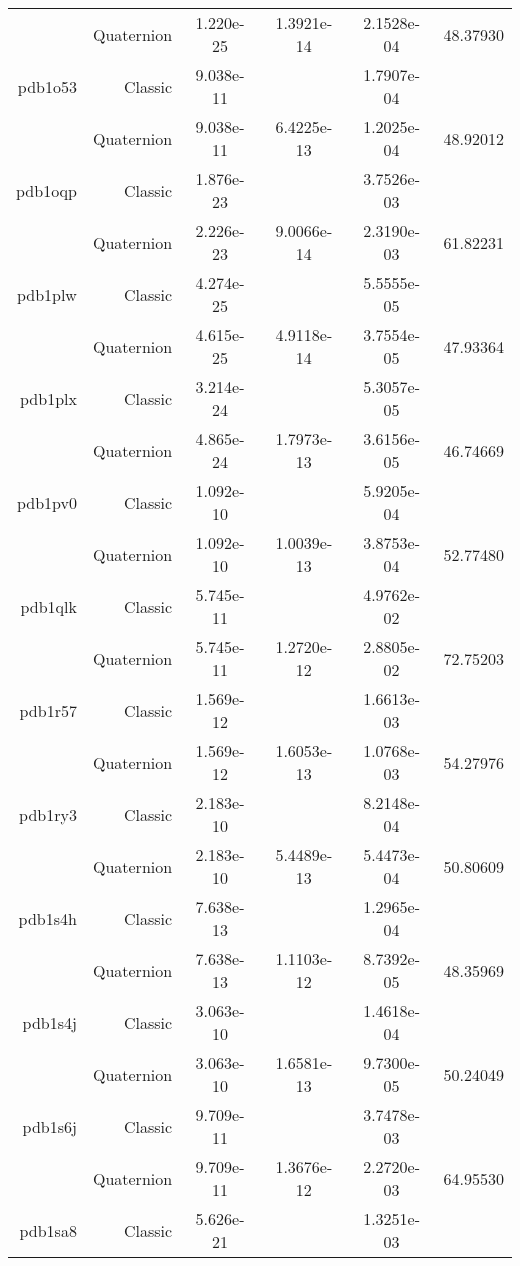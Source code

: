\begin{xltabular}{\textwidth}{r|rS[table-format=1.3e+2]S[table-format=1.4e+2]S[table-format=1.4e+2]S[table-format=-1.5]}
& Quaternion & 1.220e-25 & 1.3921e-14 & 2.1528e-04 & 48.37930\\  \addlinespace
pdb1o53 & Classic & 9.038e-11 &  & 1.7907e-04 & \\
& Quaternion & 9.038e-11 & 6.4225e-13 & 1.2025e-04 & 48.92012\\  \addlinespace
pdb1oqp & Classic & 1.876e-23 &  & 3.7526e-03 & \\
& Quaternion & 2.226e-23 & 9.0066e-14 & 2.3190e-03 & 61.82231\\  \addlinespace
pdb1plw & Classic & 4.274e-25 &  & 5.5555e-05 & \\
& Quaternion & 4.615e-25 & 4.9118e-14 & 3.7554e-05 & 47.93364\\  \addlinespace
pdb1plx & Classic & 3.214e-24 &  & 5.3057e-05 & \\
& Quaternion & 4.865e-24 & 1.7973e-13 & 3.6156e-05 & 46.74669\\  \addlinespace
pdb1pv0 & Classic & 1.092e-10 &  & 5.9205e-04 & \\
& Quaternion & 1.092e-10 & 1.0039e-13 & 3.8753e-04 & 52.77480\\  \addlinespace
pdb1qlk & Classic & 5.745e-11 &  & 4.9762e-02 & \\
& Quaternion & 5.745e-11 & 1.2720e-12 & 2.8805e-02 & 72.75203\\  \addlinespace
pdb1r57 & Classic & 1.569e-12 &  & 1.6613e-03 & \\
& Quaternion & 1.569e-12 & 1.6053e-13 & 1.0768e-03 & 54.27976\\  \addlinespace
pdb1ry3 & Classic & 2.183e-10 &  & 8.2148e-04 & \\
& Quaternion & 2.183e-10 & 5.4489e-13 & 5.4473e-04 & 50.80609\\  \addlinespace
pdb1s4h & Classic & 7.638e-13 &  & 1.2965e-04 & \\
& Quaternion & 7.638e-13 & 1.1103e-12 & 8.7392e-05 & 48.35969\\  \addlinespace
pdb1s4j & Classic & 3.063e-10 &  & 1.4618e-04 & \\
& Quaternion & 3.063e-10 & 1.6581e-13 & 9.7300e-05 & 50.24049\\  \addlinespace
pdb1s6j & Classic & 9.709e-11 &  & 3.7478e-03 & \\
& Quaternion & 9.709e-11 & 1.3676e-12 & 2.2720e-03 & 64.95530\\  \addlinespace
pdb1sa8 & Classic & 5.626e-21 &  & 1.3251e-03 & \\

\end{xltabular}
